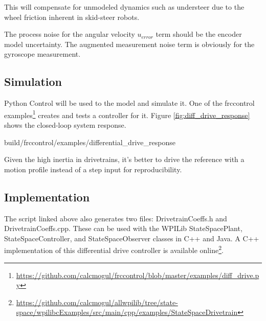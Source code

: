 This will compensate for unmodeled dynamics such as understeer due to the wheel
friction inherent in skid-steer robots.

\begin{remark}
  The process noise for the angular velocity $u_{error}$ term should be the
  encoder \gls{model} uncertainty. The augmented measurement noise term is
  obviously for the gyroscope measurement.
\end{remark}

\subsection{Simulation}

Python Control will be used to  the
\gls{model} and simulate it. One of the frccontrol
examples\footnote{\url{https://github.com/calcmogul/frccontrol/blob/master/examples/diff_drive.py}}
creates and tests a controller for it. Figure \ref{fig:diff_drive_response}
shows the closed-loop \gls{system} response.

\begin{svg}{build/frccontrol/examples/differential_drive_response}
  \caption{Drivetrain response}
  \label{fig:diff_drive_response}
\end{svg}

Given the high inertia in drivetrains, it's better to drive the \gls{reference}
with a motion profile instead of a \gls{step input} for reproducibility.

\subsection{Implementation}

The script linked above also generates two files: DrivetrainCoeffs.h and
DrivetrainCoeffs.cpp. These can be used with the WPILib StateSpacePlant,
StateSpaceController, and StateSpaceObserver classes in C++ and Java. A C++
implementation of this differential drive controller is available
online\footnote{
\url{https://github.com/calcmogul/allwpilib/tree/state-space/wpilibcExamples/src/main/cpp/examples/StateSpaceDrivetrain}}.
